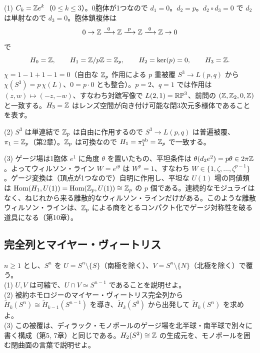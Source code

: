 \begin{solution}
(1) $C_k=\mathbb{Z} e^k$（$0\le k\le3$）。0胞体が1つなので $d_1=0$。$d_2=p$。$d_2\circ d_3=0$ で $d_2$ は単射なので $d_3=0$。胞体鎖複体は
\[
0\to\Z\xrightarrow{\ 0\ }\Z\xrightarrow{\ p\ }\Z\xrightarrow{\ 0\ }\Z\to0
\]
で
\[
H_0=\mathbb{Z},\qquad H_1=\mathbb{Z}/p\mathbb{Z}=\mathbb{Z}_p,\qquad H_2=\ker(p)=0,\qquad H_3=\mathbb{Z} .
\]
$\chi=1-1+1-1=0$（自由な $\mathbb{Z}_p$ 作用による $p$ 重被覆 $S^3\to L(p,q)$ から $\chi(S^3)=p\,\chi(L)$、$0=p\cdot0$ とも整合）。$p=2$、$q=1$ では作用は $(z,w)\mapsto(-z,-w)$、すなわち対蹠写像で $L(2,1)=\mathbb{RP}^3$、前問の $(\mathbb{Z},\mathbb{Z}_2,0,\mathbb{Z})$ と一致する。$H_3=\mathbb{Z}$ はレンズ空間が向き付け可能な閉3次元多様体であることを表す。

(2) $S^3$ は単連結で $\mathbb{Z}_p$ は自由に作用するので $S^3\to L(p,q)$ は普遍被覆、$\pi_1=\mathbb{Z}_p$（第2章）。$\mathbb{Z}_p$ は可換なので $H_1=\pi_1^{\mathrm{ab}}=\mathbb{Z}_p$ で一致する。

(3) ゲージ場は1胞体 $e^1$ に角度 $\theta$ を置いたもの、平坦条件は $\theta(d_2e^2)=p\theta\in2\pi\mathbb{Z}$。よってウィルソン・ライン $W=e^{i\theta}$ は $W^p=1$、すなわち $W\in\{1,\zeta,\dots,\zeta^{p-1}\}$。ゲージ変換は（頂点が1つなので）自明に作用し、平坦な $U(1)$ 場の同値類は $\operatorname{Hom}(H_1,U(1))=\operatorname{Hom}(\mathbb{Z}_p,U(1))\cong\mathbb{Z}_p$ の $p$ 個である。連続的なモジュライはなく、ねじれから来る離散的なウィルソン・ラインだけがある。このような離散ウィルソン・ラインは、$\mathbb{Z}_p$ による商をとるコンパクト化でゲージ対称性を破る道具になる（第10章）。
\end{solution}

\subsection{完全列とマイヤー・ヴィートリス}

\begin{problem}[難易度 B]\label{ch04-prob-mvsphere}
$n\ge1$ とし、$S^n$ を $U=S^n\setminus\{S\}$（南極を除く）、$V=S^n\setminus\{N\}$（北極を除く）で覆う。\\
(1) $U,V$ は可縮で、$U\cap V\simeq S^{n-1}$ であることを説明せよ。\\
(2) 被約ホモロジーのマイヤー・ヴィートリス完全列から $\tilde H_k(S^n)\cong\tilde H_{k-1}(S^{n-1})$ を導き、$\tilde H_k(S^0)$ から出発して $\tilde H_k(S^n)$ を求めよ。\\
(3) この被覆は、ディラック・モノポールのゲージ場を北半球・南半球で別々に書く構成（第5, 7章）と同じである。$H_2(S^2)\cong\mathbb{Z}$ の生成元を、モノポールを囲む閉曲面の言葉で説明せよ。
\end{problem}

